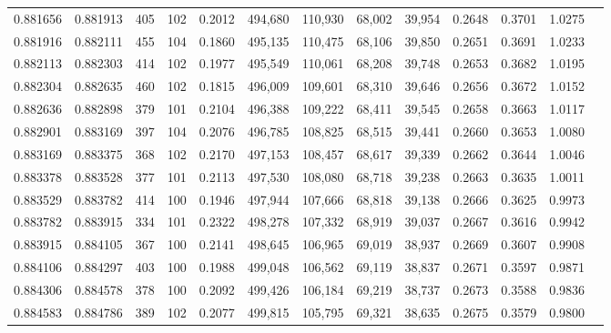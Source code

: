\begin{tabular}{rrrrrrrrrrrrr}
0.881656 & 0.881913 &   405 & 102 &                                     0.2012 & 494,680 & 110,930 &  68,002 &  39,954 & 0.2648 & 0.3701 & 1.0275 \\
0.881916 & 0.882111 &   455 & 104 &                                     0.1860 & 495,135 & 110,475 &  68,106 &  39,850 & 0.2651 & 0.3691 & 1.0233 \\
0.882113 & 0.882303 &   414 & 102 &                                     0.1977 & 495,549 & 110,061 &  68,208 &  39,748 & 0.2653 & 0.3682 & 1.0195 \\
0.882304 & 0.882635 &   460 & 102 &                                     0.1815 & 496,009 & 109,601 &  68,310 &  39,646 & 0.2656 & 0.3672 & 1.0152 \\
0.882636 & 0.882898 &   379 & 101 &                                     0.2104 & 496,388 & 109,222 &  68,411 &  39,545 & 0.2658 & 0.3663 & 1.0117 \\
0.882901 & 0.883169 &   397 & 104 &                                     0.2076 & 496,785 & 108,825 &  68,515 &  39,441 & 0.2660 & 0.3653 & 1.0080 \\
0.883169 & 0.883375 &   368 & 102 &                                     0.2170 & 497,153 & 108,457 &  68,617 &  39,339 & 0.2662 & 0.3644 & 1.0046 \\
0.883378 & 0.883528 &   377 & 101 &                                     0.2113 & 497,530 & 108,080 &  68,718 &  39,238 & 0.2663 & 0.3635 & 1.0011 \\
0.883529 & 0.883782 &   414 & 100 &                                     0.1946 & 497,944 & 107,666 &  68,818 &  39,138 & 0.2666 & 0.3625 & 0.9973 \\
0.883782 & 0.883915 &   334 & 101 &                                     0.2322 & 498,278 & 107,332 &  68,919 &  39,037 & 0.2667 & 0.3616 & 0.9942 \\
0.883915 & 0.884105 &   367 & 100 &                                     0.2141 & 498,645 & 106,965 &  69,019 &  38,937 & 0.2669 & 0.3607 & 0.9908 \\
0.884106 & 0.884297 &   403 & 100 &                                     0.1988 & 499,048 & 106,562 &  69,119 &  38,837 & 0.2671 & 0.3597 & 0.9871 \\
0.884306 & 0.884578 &   378 & 100 &                                     0.2092 & 499,426 & 106,184 &  69,219 &  38,737 & 0.2673 & 0.3588 & 0.9836 \\
0.884583 & 0.884786 &   389 & 102 &                                     0.2077 & 499,815 & 105,795 &  69,321 &  38,635 & 0.2675 & 0.3579 & 0.9800 \\

\end{tabular}
